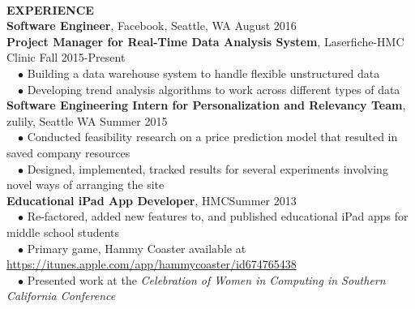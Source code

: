 \documentclass[11.5pt]{article}
\newcommand{\wrapTitle}[1]{{\sectionNL \textbf{\Large #1}} \sectionNL}
\newcommand{\sectionNL}{~\\[1pt]}
\newcommand{\customtab}{$\hspace{10pt} \bullet \hspace{2pt}$}
\newcommand{\HMC}{HMC}
\newcommand{\rightAlign}{\hfill}
\begin{document}
\begin{flushleft}
\wrapTitle{EXPERIENCE}
\textbf{Software Engineer}, Facebook, Seattle, WA \rightAlign August 2016 \\
\textbf{Project Manager for Real-Time Data Analysis System}, Laserfiche-HMC Clinic \rightAlign Fall 2015-Present \\ 
\customtab Building a data warehouse system to handle flexible unstructured data \\
\customtab Developing trend analysis algorithms to work across different types of data \\
\textbf{Software Engineering Intern for Personalization and Relevancy Team}, zulily, Seattle WA \rightAlign Summer 2015 \\
\customtab Conducted feasibility research on a price prediction model that resulted in saved company resources \\
\customtab Designed, implemented, tracked results for several experiments involving novel ways of arranging the site \\

\textbf{Educational iPad App Developer}, \HMC \rightAlign Summer 2013 \\
\customtab Re-factored, added new features to, and published educational iPad apps for middle school students \\
\customtab Primary game, Hammy Coaster available at \url{https://itunes.apple.com/app/hammycoaster/id674765438} \\
\customtab Presented work at the \textit{Celebration of Women in Computing in Southern California Conference }
\end{flushleft}


\end{document}
